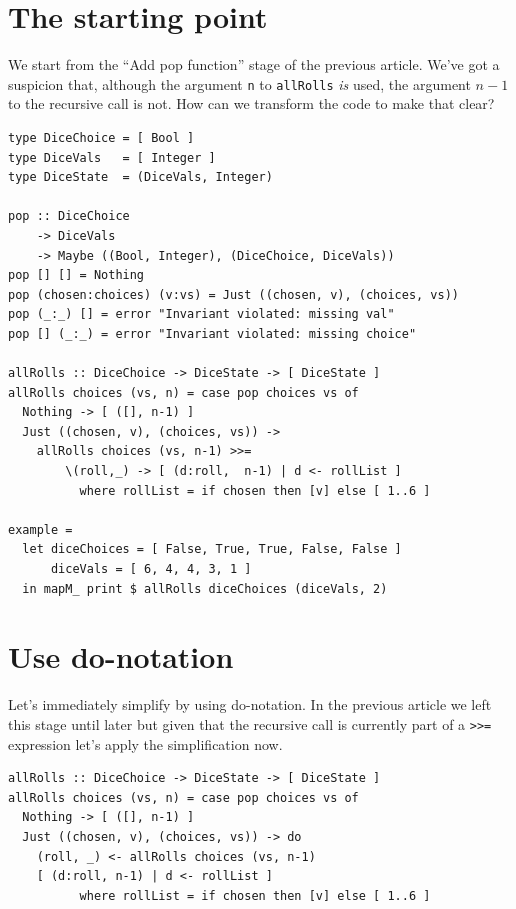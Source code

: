 \section{The starting point}


We start from the ``Add pop function'' stage of the previous article. We've got a suspicion that, although the argument \texttt{n} to \texttt{allRolls} \textit{is} used, the argument $n-1$ to the recursive call is not. How can we transform the code to make that clear?

\begin{verbatim}
type DiceChoice = [ Bool ]
type DiceVals   = [ Integer ]
type DiceState  = (DiceVals, Integer)

pop :: DiceChoice
    -> DiceVals
    -> Maybe ((Bool, Integer), (DiceChoice, DiceVals))
pop [] [] = Nothing
pop (chosen:choices) (v:vs) = Just ((chosen, v), (choices, vs))
pop (_:_) [] = error "Invariant violated: missing val"
pop [] (_:_) = error "Invariant violated: missing choice"

allRolls :: DiceChoice -> DiceState -> [ DiceState ]
allRolls choices (vs, n) = case pop choices vs of
  Nothing -> [ ([], n-1) ]
  Just ((chosen, v), (choices, vs)) ->
    allRolls choices (vs, n-1) >>=
        \(roll,_) -> [ (d:roll,  n-1) | d <- rollList ]
          where rollList = if chosen then [v] else [ 1..6 ]

example =
  let diceChoices = [ False, True, True, False, False ]
      diceVals = [ 6, 4, 4, 3, 1 ]
  in mapM_ print $ allRolls diceChoices (diceVals, 2)
\end{verbatim}

\section{Use do-notation}


Let's immediately simplify by using do-notation. In the previous article we left this stage until later but given that the recursive call is currently part of a \texttt{>>=} expression let's apply the simplification now.

\begin{verbatim}
allRolls :: DiceChoice -> DiceState -> [ DiceState ]
allRolls choices (vs, n) = case pop choices vs of
  Nothing -> [ ([], n-1) ]
  Just ((chosen, v), (choices, vs)) -> do
    (roll, _) <- allRolls choices (vs, n-1)
    [ (d:roll, n-1) | d <- rollList ]
          where rollList = if chosen then [v] else [ 1..6 ]
\end{verbatim}



